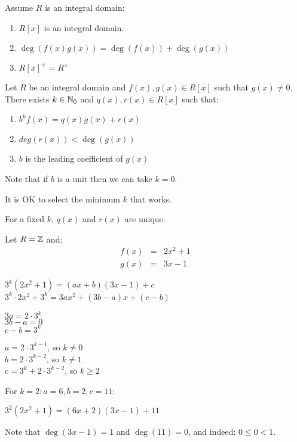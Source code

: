 \documentclass[letterpaper,12pt,fleqn]{article}
\newcommand{\x}{\times}
\begin{document}
\begin{properties}
  Assume $R$ is an integral domain:
  \begin{enumerate}
  \item $R[x]$ is an integral domain.
  \item $\deg(f(x)g(x))=\deg(f(x))+\deg(g(x))$
  \item $R[x]^{\x}=R^{\x}$
  \end{enumerate}
\end{properties}

\begin{theorem}
  Let $R$ be an integral domain and $f(x),g(x)\in R[x]$ such that $g(x)\ne0$.
  There exists $k\in\mathbb{N}_0$ and $q(x),r(x)\in R[x]$ such that:
  \begin{enumerate}
  \item $b^kf(x)=q(x)g(x)+r(x)$
  \item $deg(r(x))<\deg(g(x))$
  \item $b$ is the leading coefficient of $g(x)$
  \end{enumerate}
  Note that if $b$ is a unit then we can take $k=0$.

  It is OK to select the minimum $k$ that works.

  For a fixed $k$, $q(x)$ and $r(x)$ are unique.
\end{theorem}

\begin{example}
  Let $R=\mathbb{Z}$ and:
  \begin{eqnarray*}
    f(x) &=& 2x^2+1 \\
    g(x) &=& 3x-1
  \end{eqnarray*}

  $3^k(2x^2+1)=(ax+b)(3x-1)+c$ \\
  $3^k\cdot2x^2+3^k=3ax^2+(3b-a)x+(c-b)$

  $3a=2\cdot3^k$ \\
  $3b-a=0$ \\
  $c-b=3^k$

  $a=2\cdot3^{k-1}$, so $k\ne0$ \\
  $b=2\cdot3^{k-2}$, so $k\ne1$ \\
  $c=3^k+2\cdot3^{k-2}$, so $k\ge 2$

  For $k=2: a=6, b=2, c=11$:

  $3^2(2x^2+1)=(6x+2)(3x-1)+11$

  Note that $\deg(3x-1)=1$ and $\deg(11)=0$, and indeed: $0\le0<1$.
\end{example}
\end{document}
